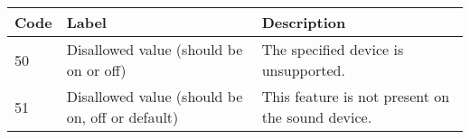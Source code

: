 \documentclass[
]{book}
\begin{document}
\begin{tabular}{l|l|l}
\hline
Code & Label & Description\\
\hline
50 & Disallowed value (should be on or off) & The specified device is unsupported.\\
\hline
51 & Disallowed value (should be on, off or default) & This feature is not present on the sound device.\\
\hline
\end{tabular}

  
\end{document}
